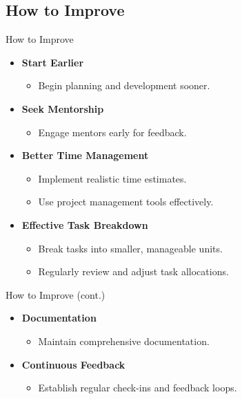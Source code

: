 \documentclass{beamer}
\begin{document}
\subsection{How to Improve}
\begin{frame}{How to Improve}
    \begin{itemize}
        \item \textbf{Start Earlier}
        \begin{itemize}
            \item Begin planning and development sooner.
        \end{itemize}
        \item \textbf{Seek Mentorship}
        \begin{itemize}
            \item Engage mentors early for feedback.
        \end{itemize}
        \item \textbf{Better Time Management}
        \begin{itemize}
            \item Implement realistic time estimates.
            \item Use project management tools effectively.
        \end{itemize}
        \item \textbf{Effective Task Breakdown}
        \begin{itemize}
            \item Break tasks into smaller, manageable units.
            \item Regularly review and adjust task allocations.
        \end{itemize}
    \end{itemize}
\end{frame}

\begin{frame}{How to Improve (cont.)}
    \begin{itemize}
        \item \textbf{Documentation}
        \begin{itemize}
            \item Maintain comprehensive documentation.
        \end{itemize}
        \item \textbf{Continuous Feedback}
        \begin{itemize}
            \item Establish regular check-ins and feedback loops.
        \end{itemize}
    \end{itemize}
\end{frame}
\end{document}
